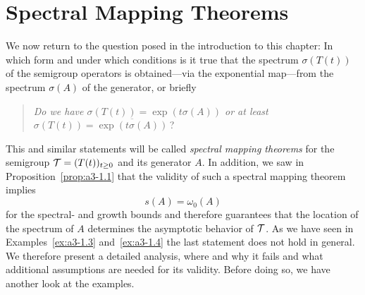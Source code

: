 \section{Spectral Mapping Theorems}\label{sec:a3-6}%
We now return to the question posed in the introduction to this chapter: In which form and under which conditions is it true that the spectrum $\sigma(T(t))$ of the semigroup operators is obtained---via the exponential map---from the spectrum $\sigma(A)$ of the generator, or briefly
\begin{quote}\emph{
Do we have  $\sigma(T(t)) = \exp(t \sigma(A) )$  or at least 
 $\sigma(T(t)) = \overline{\exp(t\sigma(A))}$}\,?
\end{quote}
This and similar statements will be called \emph{spectral mapping theorems} for the semigroup $\TT = (T(t))_{t \geq 0}$ and its generator $A$.
In addition, we saw in Proposition~\ref{prop:a3-1.1} that the validity of such a spectral mapping theorem implies
\[
s(A) = \omega_{0}(A)
\]
for the spectral- and growth bounds and therefore guarantees that the location of the spectrum of\/ $A$ determines the asymptotic behavior of\/ $\mathcal{T}$. 
As we have seen in Examples~\ref{ex:a3-1.3} and~\ref{ex:a3-1.4} the last statement does not hold in general.
We therefore present a detailed analysis, where and why it fails and what additional assumptions are needed for its validity.
Before doing so, we have another look at the examples.
